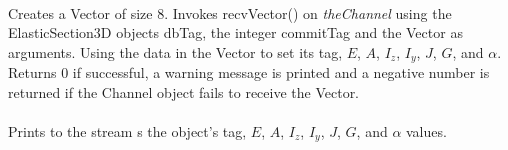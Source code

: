 \\
Creates a Vector of size $8$. Invokes recvVector() on  {\em
theChannel} using the ElasticSection3D objects \p dbTag, the integer
\p commitTag and the Vector as arguments. Using the data in the
Vector to set its \p tag, $E$, $A$, $I_z$, $I_y$, $J$, $G$, and $\alpha$.
Returns $0$ if successful, a warning message is printed and a negative number
is returned if the Channel object fails to receive the Vector. \\

 \\
Prints to the stream \p s the object's \p tag, $E$, $A$, $I_z$, $I_y$, $J$, 
$G$, and $\alpha$ values. \\




